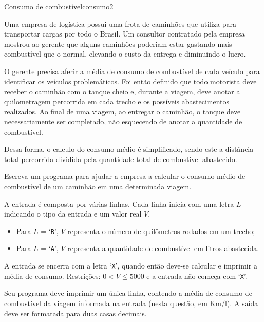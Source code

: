 \documentclass[12pt,a4paper,oneside]{article}
\begin{document}
\begin{problem}{Consumo de combustível}{consumo}{2}

\small
Uma empresa de logística possui uma frota de caminhões que utiliza para transportar cargas por todo o Brasil. Um consultor contratado pela empresa mostrou ao gerente que alguns caminhões poderiam estar gastando mais combustível que o normal, elevando o custo da entrega e diminuindo o lucro.

O gerente precisa aferir a média de consumo de combustível de cada veículo para identificar os veículos problemáticos. Foi então definido que todo motorista deve receber o caminhão com o tanque cheio e, durante a viagem, deve anotar a quilometragem percorrida em cada trecho e os possíveis abastecimentos realizados. Ao final de uma viagem, ao entregar o caminhão, o tanque deve necessariamente ser completado, não esquecendo de anotar a quantidade de combustível.

Dessa forma, o calculo do consumo médio é simplificado, sendo este a distância total percorrida dividida pela quantidade total de combustível abastecido.

Escreva um programa para ajudar a empresa a calcular o consumo médio de combustível de um caminhão em uma determinada viagem.

%

\InputFile

A entrada é composta por várias linhas. Cada linha inicia com uma letra $L$ indicando o tipo da entrada e um valor real $V$.

\begin{itemize}
\vspace{-9pt}
    \item Para $L$ = `\texttt{R}', $V$ representa o número de quilômetros rodados em um trecho;
\vspace{-9pt}
    \item Para $L$ = `\texttt{A}', $V$ representa a quantidade de combustível em litros abastecida.
\end{itemize}

\vspace{-9pt}
A entrada se encerra com a letra `\texttt{X}', quando então deve-se calcular e imprimir a média de consumo. Restrições: $0 < V \leq 5000$ e a entrada não começa com `\texttt{X}'.

\OutputFile

Seu programa deve imprimir um única linha, contendo a média de consumo de combustível da viagem informada na entrada (nesta questão, em Km/l). A saída deve ser formatada para duas casas decimais.


\end{problem}
\end{document}
